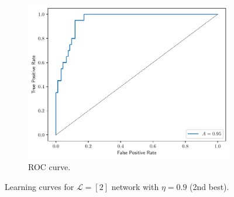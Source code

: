 \documentclass[conference]{IEEEtran}
\theoremstyle{definition}
\theoremstyle{remark}
\theoremstyle{remark}
\begin{document}
\begin{figure}
\begin{subfigure}[b]{0.32\textwidth}
        \includegraphics[width=\textwidth]{figs/2-0.9-roc.pdf}
        \caption{ROC curve.}
    \end{subfigure}
    \caption{Learning curves for $\mathcal{L}=[2]$ network with $\eta=0.9$
     (2nd best).}
    \label{fig:NN-2best}
\end{figure}
\end{document}
